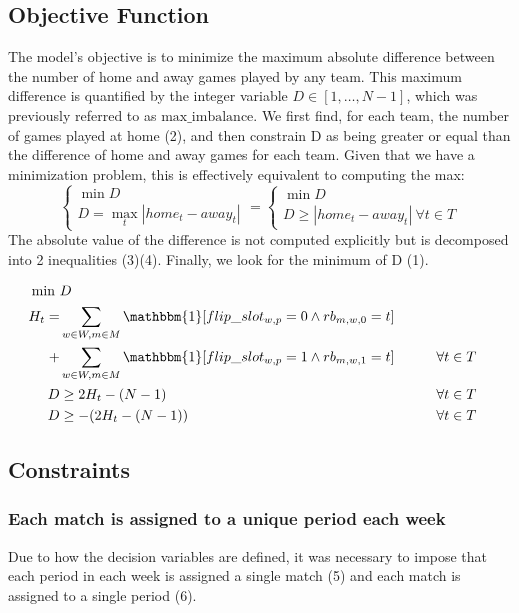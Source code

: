\subsection{Objective Function}
The model's objective is to minimize the maximum absolute difference between the number of home and away games played by any team. This maximum difference is quantified by the integer variable $D \in [1, \dots, N-1]$, which was previously referred to as $\text{max\_imbalance}$. We first find, for each team, the number of games played at home (2), and then constrain D as being greater or equal than the difference of home and away games for each team. Given that we have a minimization problem, this is effectively equivalent to computing the max: 
$$\begin{cases}
    \min D \\
    D = \max_t |home_t - away_t|
\end{cases} = \begin{cases}
    \min D \\
    D \geq |home_t - away_t| \ \forall t \in T
\end{cases}$$The absolute value of the difference is not computed explicitly but is decomposed into 2 inequalities (3)(4). Finally, we look for the minimum of D (1).

\begin{align}
    \min \ &D \\
    H_t =& \sum_{w \in W, m \in M} \mathbbm{1}[flip\_slot_{w,p} = 0 \land rb_{m,w,0} = t] \notag \\
    +& \sum_{w \in W, m \in M} \mathbbm{1}[flip\_slot_{w,p} = 1 \land rb_{m, w,1} = t] \hspace{20px}  && \forall t \in T\\
    D &\geq 2H_t - (N-1) && \forall t \in T\\
    D & \geq -(2 H_t - (N-1)) && \forall t \in T
\end{align}

\subsection{Constraints}
\subsubsection{Each match is assigned to a unique period each week}
Due to how the decision variables are defined, it was necessary to impose that each period in each week is assigned a single match (5) and each match is assigned to a single period (6).

